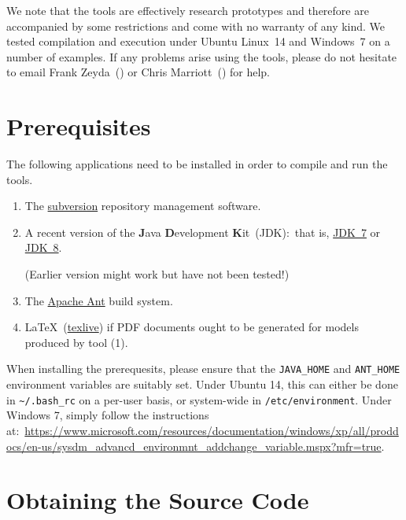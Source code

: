 \documentclass{report}
\begin{document}
We note that the tools are effectively research prototypes and therefore are accompanied by some restrictions and come with no warranty of any kind. We tested compilation and execution under Ubuntu Linux~14 and Windows~7 on a number of examples. If any problems arise using the tools, please do not hesitate to email Frank Zeyda~() or Chris Marriott~() for help.


\section{Prerequisites}

The following applications need to be installed in order to compile and run the {\hiJAC} tools.
%
\begin{enumerate}
  \item The \href{https://subversion.apache.org/}{subversion} repository management software.

  \item A recent version of the \textbf{J}ava \textbf{D}evelopment \textbf{K}it~(JDK):~that is, \href{http://www.oracle.com/technetwork/java/javase/downloads/jdk7-downloads-1880260.html}{JDK~7} or \href{http://www.oracle.com/technetwork/java/javase/downloads/jdk8-downloads-2133151.html}{JDK~8}.

  (Earlier version might work but have not been tested!)

  \item The \href{http://ant.apache.org/}{Apache Ant} build system.

  \item {\LaTeX}~(\href{https://www.tug.org/texlive/}{texlive}) if PDF documents ought to be generated for {\Circus} models produced by tool (1).
\end{enumerate}
%
When installing the prerequesits, please ensure that the \verb"JAVA_HOME" and \verb"ANT_HOME" environment variables are suitably set. Under Ubuntu 14, this can either be done in \verb"~/.bash_rc" on a per-user basis, or system-wide in \verb"/etc/environment". Under Windows 7, simply follow the instructions at:~{\footnotesize\url{https://www.microsoft.com/resources/documentation/windows/xp/all/proddocs/en-us/sysdm_advancd_environmnt_addchange_variable.mspx?mfr=true}}.

\pagebreak

\section{Obtaining the Source Code}
\end{document}
